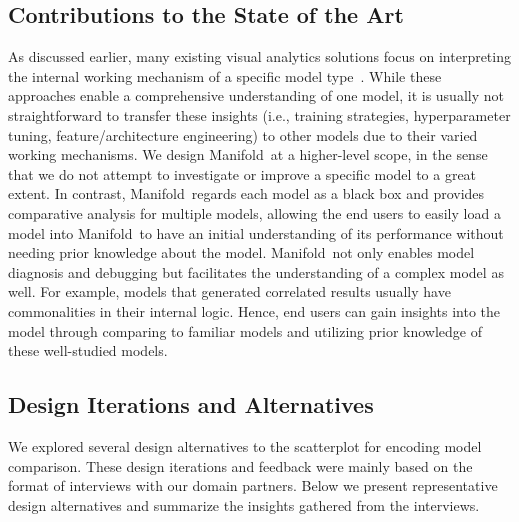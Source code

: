 \documentclass[preprint,journal]{vgtc}       %
\newcommand{\revcolor}{black}
\newcommand{\techname}{Manifold}
\begin{document}
\subsection{Contributions to the State of the Art}

As discussed earlier, many existing visual analytics solutions focus on interpreting the internal working mechanism of a specific model type~\cite{wongsuphasawat2018visualizing, ming2017understanding, kahng2018cti, liu2017towards, strobelt2018lstmvis, rauber2017visualizing}. While these approaches enable a comprehensive understanding of one model, it is usually not straightforward to transfer these insights (i.e., training strategies, hyperparameter tuning, feature/architecture engineering) to other models due to their varied working mechanisms. We design \techname\ at a higher-level scope, in the sense that we do not attempt to investigate or improve a specific model to a great extent. In contrast, \techname\ regards each model as a black box and provides comparative analysis for multiple models, allowing the end users to easily load a model into \techname\ to have an initial understanding of its performance without needing prior knowledge about the model. \techname\ not only enables model diagnosis and debugging but facilitates the understanding of a complex model as well. For example, models that generated correlated results usually have commonalities in their internal logic. Hence, end users can gain insights into the model through comparing to familiar models and utilizing prior knowledge of these well-studied models.

\subsection{Design Iterations and Alternatives}
\label{sec:design_alterative}

\color{\revcolor}
We explored several design alternatives to the scatterplot for encoding model comparison. These design iterations and feedback were mainly based on the format of interviews with our domain partners. Below we present representative design alternatives and summarize the insights gathered from the interviews.
\end{document}
